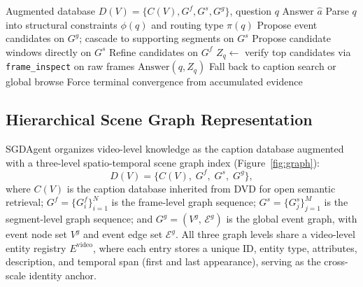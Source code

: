 \documentclass[sigconf, screen, review, anonymous]{acmart}
\begin{document}
\begin{algorithm}[t]
\caption{Graph-Guided Search}
\label{alg:search}
\begin{algorithmic}[1]
\Require Augmented database $D(V)=\{C(V), G^f, G^s, G^g\}$, question $q$
\Ensure Answer $\hat{a}$
\State Parse $q$ into structural constraints $\phi(q)$
  and routing type $\pi(q)$
    \State Propose event candidates on $G^g$;
      cascade to supporting segments on $G^s$
\Else
    \State Propose candidate windows directly on $G^s$
\EndIf
\Repeat
        \State Refine candidates on $G^f$
    \EndIf
    \State $Z_q \leftarrow$ verify top candidates via
      \texttt{frame\_inspect} on raw frames
        \State \Return $\mathrm{Answer}(q, Z_q)$
        \State Fall back to caption search or global browse
    \EndIf
{}
\State Force terminal convergence from accumulated evidence
\end{algorithmic}
\end{algorithm}


\subsection{Hierarchical Scene Graph Representation}
\label{sec:representation}

SGDAgent organizes video-level knowledge as the caption database augmented
with a three-level spatio-temporal scene graph index
(Figure~\ref{fig:graph}):
\begin{equation}
  D(V) = \bigl\{C(V),\; G^{f},\; G^{s},\; G^{g}\bigr\},
\end{equation}
where $C(V)$ is the caption database inherited from DVD for open semantic
retrieval; $G^{f}=\{G_i^{f}\}_{i=1}^{N}$ is the frame-level graph
sequence; $G^{s}=\{G_j^{s}\}_{j=1}^{M}$ is the segment-level graph
sequence; and $G^{g}=(V^{g},\,\mathcal{E}^{g})$ is the global event graph,
with event node set $V^{g}$ and event edge set $\mathcal{E}^{g}$.
All three graph levels share a video-level entity registry
$E^{\text{video}}$, where each entry stores a unique ID, entity type,
attributes, description, and temporal span (first and last appearance),
serving as the cross-scale identity anchor.
\end{document}
